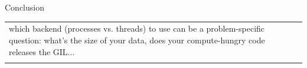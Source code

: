 \documentclass[13pt, usenames,dvipsnames]{beamer} %
\begin{document}
\begin{frame}[fragile]{Conclusion}
{\begin{tabular}{m{0.5cm} m{10cm}}
        which backend (processes vs. threads) to use can be a
            problem-specific question: what's the size of your data, does your
            compute-hungry code releases the GIL... \\
                                                                        & \\
        \end{tabular}
        }
\end{frame}
\end{document}
